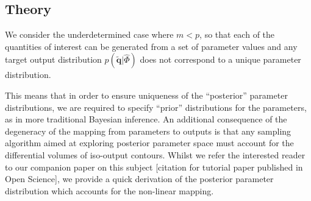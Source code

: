 \subsection{Theory}

We consider the underdetermined case where $m<p$, so that each of the quantities of interest can be generated from a set of parameter values and any
target output distribution $p(\tilde{\boldsymbol{q}}|\hat{\Phi})$ does not correspond to a unique parameter distribution.



This means that in order to ensure uniqueness of the ``posterior'' parameter distributions, we are required to specify ``prior'' distributions for the parameters, as in more traditional Bayesian inference. An additional consequence of the degeneracy of the mapping from parameters to outputs is that any sampling algorithm aimed at exploring posterior parameter space must account for the differential volumes of iso-output contours. Whilst we refer the interested reader to our companion paper on this subject [citation for tutorial paper published in Open Science], we provide a quick derivation of the posterior parameter distribution which accounts for the non-linear mapping.

